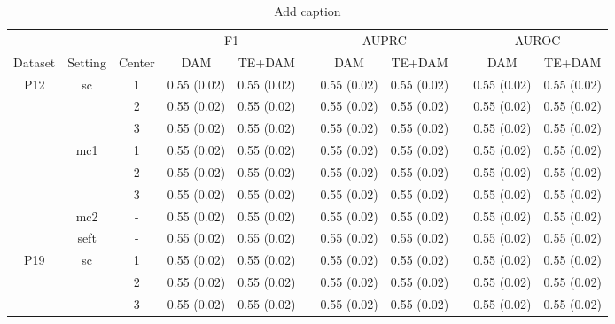 \documentclass[journal,twoside,web]{ieeecolor}
\begin{document}
\begin{table}[htbp]
    \centering
    \caption{Add caption}
      \begin{tabular}{ccccccccccc}
      \toprule
            &       &       & \multicolumn{2}{c}{F1} &       & \multicolumn{2}{c}{AUPRC} &       & \multicolumn{2}{c}{AUROC} \\
  \cmidrule{4-5}\cmidrule{7-8}\cmidrule{10-11}    Dataset & Setting & Center & DAM   & TE+DAM &       & DAM   & TE+DAM &       & DAM   & TE+DAM \\
      \midrule
      \multirow{8}[6]{*}{P12} & \multirow{3}[2]{*}{sc} & 1     & 0.55 (0.02) & 0.55 (0.02) &       & 0.55 (0.02) & 0.55 (0.02) &       & 0.55 (0.02) & 0.55 (0.02) \\
            &       & 2     & 0.55 (0.02) & 0.55 (0.02) &       & 0.55 (0.02) & 0.55 (0.02) &       & 0.55 (0.02) & 0.55 (0.02) \\
            &       & 3     & 0.55 (0.02) & 0.55 (0.02) &       & 0.55 (0.02) & 0.55 (0.02) &       & 0.55 (0.02) & 0.55 (0.02) \\
  \cmidrule{2-11}          & \multirow{3}[2]{*}{mc1} & 1     & 0.55 (0.02) & 0.55 (0.02) &       & 0.55 (0.02) & 0.55 (0.02) &       & 0.55 (0.02) & 0.55 (0.02) \\
            &       & 2     & 0.55 (0.02) & 0.55 (0.02) &       & 0.55 (0.02) & 0.55 (0.02) &       & 0.55 (0.02) & 0.55 (0.02) \\
            &       & 3     & 0.55 (0.02) & 0.55 (0.02) &       & 0.55 (0.02) & 0.55 (0.02) &       & 0.55 (0.02) & 0.55 (0.02) \\
  \cmidrule{2-11}          & mc2   & -     & 0.55 (0.02) & 0.55 (0.02) &       & 0.55 (0.02) & 0.55 (0.02) &       & 0.55 (0.02) & 0.55 (0.02) \\
            & seft  & -     & 0.55 (0.02) & 0.55 (0.02) &       & 0.55 (0.02) & 0.55 (0.02) &       & 0.55 (0.02) & 0.55 (0.02) \\
      \midrule
      \multirow{8}[6]{*}{P19} & \multirow{3}[2]{*}{sc} & 1     & 0.55 (0.02) & 0.55 (0.02) &       & 0.55 (0.02) & 0.55 (0.02) &       & 0.55 (0.02) & 0.55 (0.02) \\
            &       & 2     & 0.55 (0.02) & 0.55 (0.02) &       & 0.55 (0.02) & 0.55 (0.02) &       & 0.55 (0.02) & 0.55 (0.02) \\
            &       & 3     & 0.55 (0.02) & 0.55 (0.02) &       & 0.55 (0.02) & 0.55 (0.02) &       & 0.55 (0.02) & 0.55 (0.02) \\

\end{tabular}
\end{table}
\end{document}
